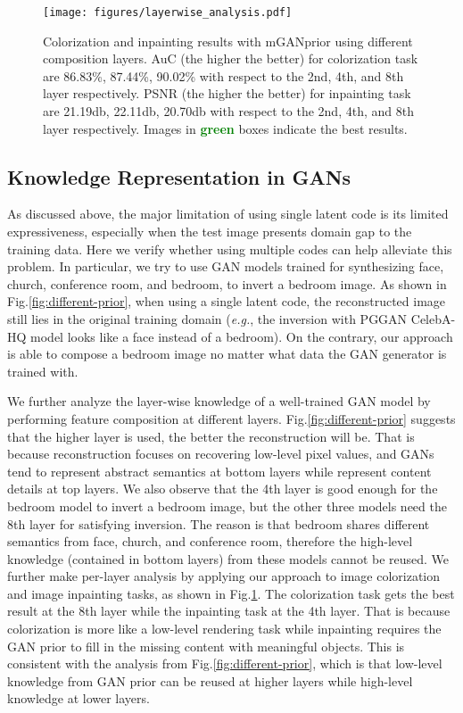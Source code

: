 \documentclass[10pt,twocolumn,letterpaper]{article}
\begin{document}
\begin{figure}[t]
  \centering
  \texttt{[image: figures/layerwise\_analysis.pdf]}
  \vspace{-20pt}
  \captionsetup{font=small}
  \caption{
    Colorization and inpainting results with mGANprior using different composition layers.
AuC (the higher the better) for colorization task are 86.83\%, 87.44\%, 90.02\% with respect to the 2nd, 4th, and 8th layer respectively.
PSNR (the higher the better) for inpainting task are 21.19db, 22.11db, 20.70db with respect to the 2nd, 4th, and 8th layer respectively.
Images in \textcolor{green}{\textbf{green}} boxes indicate the best results.
  }
  \label{fig:layer-wise-analysis}
 \vspace{-16pt}
\end{figure}


\subsection{Knowledge Representation in GANs}\label{subsec:knowledge-representation-in-gans}
As discussed above, the major limitation of using single latent code is its limited expressiveness, especially when the test image presents domain gap to the training data.
Here we verify whether using multiple codes can help alleviate this problem.
In particular, we try to use GAN models trained for synthesizing face, church, conference room, and bedroom, to invert a bedroom image.
As shown in Fig.\ref{fig:different-prior}, when using a single latent code, the reconstructed image still lies in the original training domain (\emph{e.g.}, the inversion with PGGAN CelebA-HQ model looks like a face instead of a bedroom).
On the contrary, our approach is able to compose a bedroom image no matter what data the GAN generator is trained with.


We further analyze the layer-wise knowledge of a well-trained GAN model by performing feature composition at different layers.
Fig.\ref{fig:different-prior} suggests that the higher layer is used, the better the reconstruction will be.
That is because reconstruction focuses on recovering low-level pixel values, and GANs tend to represent abstract semantics at bottom layers while represent content details at top layers.
We also observe that the 4th layer is good enough for the bedroom model to invert a bedroom image, but the other three models need the 8th layer for satisfying inversion.
The reason is that bedroom shares different semantics from face, church, and conference room, therefore the high-level knowledge (contained in bottom layers) from these models cannot be reused.
We further make per-layer analysis by applying our approach to image colorization and image inpainting tasks, as shown in Fig.\ref{fig:layer-wise-analysis}.
The colorization task gets the best result at the 8th layer while the inpainting task at the 4th layer.
That is because colorization is more like a low-level rendering task while inpainting requires the GAN prior to fill in the missing content with meaningful objects.
This is consistent with the analysis from Fig.\ref{fig:different-prior}, which is that low-level knowledge from GAN prior can be reused at higher layers while high-level knowledge at lower layers.
\end{document}
